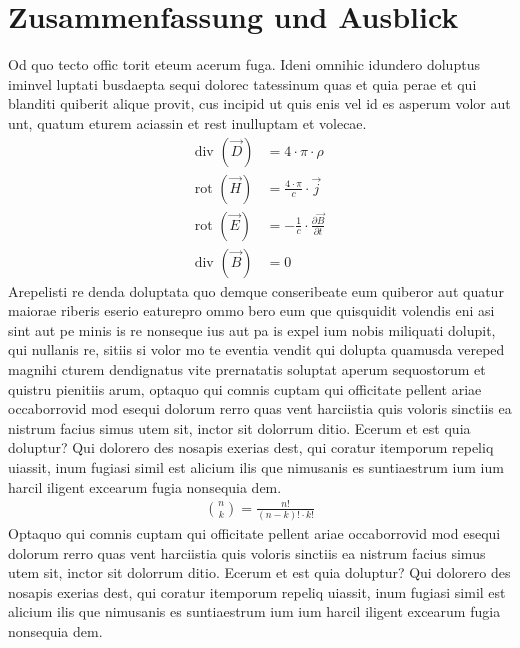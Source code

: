 \chapter{Zusammenfassung und Ausblick}
\label{cha:Zusammenfassung und Ausblick}

Od quo tecto offic torit eteum acerum fuga. Ideni omnihic idundero doluptus iminvel luptati busdaepta sequi dolorec tatessinum quas et quia perae et qui blanditi quiberit alique provit, cus incipid ut quis enis vel id es asperum volor aut unt, quatum eturem aciassin et rest inulluptam et volecae.
\begin{subequations}
	\label{maxwell-gleichungen}
	\begin{align}
	\text{div }(\vec{D}) &= 4 \cdot \pi \cdot \rho
	\label{coulomb-gesetz}\\
	\text{rot }(\vec{H}) &= \frac{4 \cdot \pi}{c} \cdot \vec{j}
	\label{ampere-gesetz}\\
	\text{rot }(\vec{E}) &= - \frac{1}{c} \cdot \frac{\partial \vec{B}}{\partial t}
	\label{faraday-gesetz-1} \\
	\text{div }(\vec{B}) &= 0
	\label{faraday-gesetz-2}
	\end{align}
\end{subequations}Arepelisti re denda doluptata quo demque conseribeate eum quiberor aut quatur maiorae riberis eserio eaturepro ommo bero eum que quisquidit volendis eni asi sint aut pe minis is re nonseque ius aut pa is expel ium nobis miliquati dolupit, qui nullanis re, sitiis si volor mo te eventia vendit qui dolupta quamusda vereped magnihi cturem dendignatus vite prernatatis soluptat aperum sequostorum et quistru pienitiis arum, optaquo qui comnis cuptam qui officitate pellent ariae occaborrovid mod esequi dolorum rerro quas vent harciistia quis voloris sinctiis ea nistrum facius simus utem sit, inctor sit dolorrum ditio. Ecerum et est quia doluptur? Qui dolorero des nosapis exerias dest, qui coratur itemporum repeliq uiassit, inum fugiasi simil est alicium ilis que nimusanis es suntiaestrum ium ium harcil iligent excearum fugia nonsequia dem.
\begin{align*}
\binom{n}{k} = \frac{n!}{(n - k)! \cdot k!}
\end{align*}
Optaquo qui comnis cuptam qui officitate pellent ariae occaborrovid mod esequi dolorum rerro quas vent harciistia quis voloris sinctiis ea nistrum facius simus utem sit, inctor sit dolorrum ditio. Ecerum et est quia doluptur? Qui dolorero des nosapis exerias dest, qui coratur itemporum repeliq uiassit, inum fugiasi simil est alicium ilis que nimusanis es suntiaestrum ium ium harcil iligent excearum fugia nonsequia dem.
